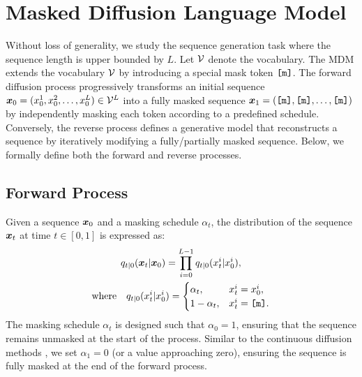 \section{Masked Diffusion Language Model}
\label{sec:mdm}

Without loss of generality, we study the sequence generation task where the sequence length is upper bounded by $L$. Let ${\mathcal{V}}$ denote the vocabulary. The MDM \citep{lou2024discrete,shi2024simplified,gong2024scaling,sahoo2024simple} extends the vocabulary ${\mathcal{V}}$ by introducing a special mask token $\texttt{[m]}$. The forward diffusion process progressively transforms an initial sequence ${\bm{x}}_0 = (x_0^1, x_0^2, \dots, x_0^L) \in {\mathcal{V}}^L$ into a fully masked sequence ${\bm{x}}_1 = (\texttt{[m]}, \texttt{[m]}, \dots, \texttt{[m]})$ by independently masking each token according to a predefined schedule. Conversely, the reverse process defines a generative model that reconstructs a sequence by iteratively modifying a fully/partially masked sequence. Below, we formally define both the forward and reverse processes.

\subsection{Forward Process}
Given a sequence ${\bm{x}}_0$ and a masking schedule $\alpha_t$, the distribution of the sequence ${\bm{x}}_t$ at time $t\in[0,1]$ is expressed as:
\begin{equation}
    \begin{gathered}
        q_{t|0}({\bm{x}}_t|{\bm{x}}_0) = \prod_{i=0}^{L-1} q_{t|0}(x_t^i|x_0^i), \\
        \text{where} \quad q_{t|0}(x_t^i|x_0^i) =
        \begin{cases}
        \alpha_t, & x_t^i = x_0^i, \\
        1-\alpha_t, & x_t^i = \texttt{[m]}.
        \end{cases}
    \end{gathered}
\end{equation}
The masking schedule $\alpha_t$ is designed such that $\alpha_0 = 1$, ensuring that the sequence remains unmasked at the start of the process. Similar to the continuous diffusion methods \citep{Ho2020Denoising, song2021denoising, Karras2022Elucidating}, we set $\alpha_1 = 0$ (or a value approaching zero), ensuring the sequence is fully masked at the end of the forward process.


